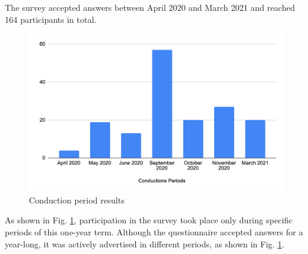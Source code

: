 The survey accepted answers between April 2020 and March 2021 and reached 164 participants in total.
\begin{figure}[ht!]
    \centering
    \includegraphics[scale=0.28]{figures/survey_conduction_period.png}
    \caption{Conduction period results}
    \label{fig:conduction_period}
\end{figure}
\FloatBarrier

As shown in Fig. \ref{fig:conduction_period}, participation in the survey took place only during specific periods of this one-year term. Although the questionnaire accepted answers for a year-long, it was actively advertised in different periods,  as shown in Fig. \ref{fig:conduction_period}.